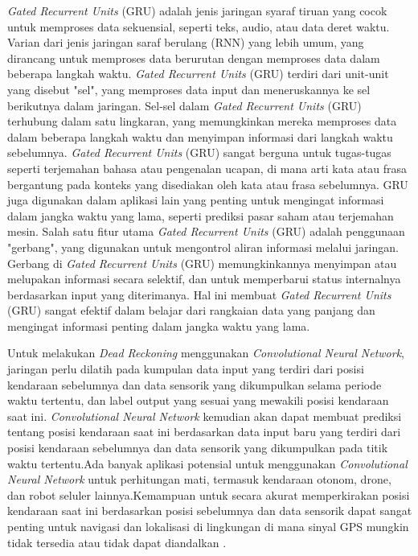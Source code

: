 \emph{Gated Recurrent Units} (GRU) adalah jenis jaringan syaraf tiruan yang cocok untuk memproses data sekuensial, seperti teks, audio, atau data deret waktu. Varian dari jenis jaringan saraf berulang (RNN) yang 
lebih umum, yang dirancang untuk memproses data berurutan dengan memproses data dalam beberapa langkah waktu. \emph{Gated Recurrent Units} (GRU) terdiri dari unit-unit yang disebut "sel", yang memproses data input 
dan meneruskannya ke sel berikutnya dalam jaringan. Sel-sel dalam \emph{Gated Recurrent Units} (GRU) terhubung dalam satu lingkaran, yang memungkinkan mereka memproses data dalam beberapa langkah waktu dan menyimpan 
informasi dari langkah waktu sebelumnya. \emph{Gated Recurrent Units} (GRU) sangat berguna untuk tugas-tugas seperti terjemahan bahasa atau pengenalan ucapan, di mana arti kata atau frasa bergantung pada konteks 
yang disediakan oleh kata atau frasa sebelumnya. GRU juga digunakan dalam aplikasi lain yang penting untuk mengingat informasi dalam jangka waktu yang lama, seperti prediksi pasar saham atau terjemahan mesin. Salah 
satu fitur utama \emph{Gated Recurrent Units} (GRU) adalah penggunaan "gerbang", yang digunakan untuk mengontrol aliran informasi melalui jaringan. Gerbang di \emph{Gated Recurrent Units} (GRU) memungkinkannya 
menyimpan atau melupakan informasi secara selektif, dan untuk memperbarui status internalnya berdasarkan input yang diterimanya. Hal ini membuat \emph{Gated Recurrent Units} (GRU) sangat efektif dalam belajar dari 
rangkaian data yang panjang dan mengingat informasi penting dalam jangka waktu yang lama. \parencite{Dey2017}

Untuk melakukan \emph{Dead Reckoning} menggunakan \emph{Convolutional Neural Network}, jaringan perlu dilatih pada kumpulan data input yang terdiri dari posisi kendaraan sebelumnya dan data sensorik yang dikumpulkan 
selama periode waktu tertentu, dan label output yang sesuai yang mewakili posisi kendaraan saat ini. \emph{Convolutional Neural Network}  kemudian akan dapat membuat prediksi tentang posisi kendaraan saat ini 
berdasarkan data input baru yang terdiri dari posisi kendaraan sebelumnya dan data sensorik yang dikumpulkan pada titik waktu tertentu.Ada banyak aplikasi potensial untuk menggunakan \emph{Convolutional Neural Network}  
untuk perhitungan mati, termasuk kendaraan otonom, drone, dan robot seluler lainnya.Kemampuan untuk secara akurat memperkirakan posisi kendaraan saat ini berdasarkan posisi sebelumnya dan data sensorik dapat sangat 
penting untuk navigasi dan lokalisasi di lingkungan di mana sinyal GPS mungkin tidak tersedia atau tidak dapat diandalkan \parencite{Albawi2017}. 

